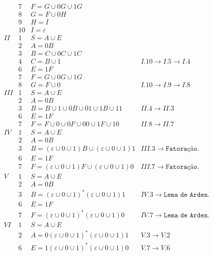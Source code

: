 \documentclass[12pt]{article}
\begin{document}
\begin{itemize}
{$$\begin{array}{ccll}
      & 7 & F = G \cup 0G \cup 1G&\\
      & 8 & G = F \cup 0H&\\
      & 9 & H = I&\\
      & 10& I = \varepsilon&\\
  \hline
   II & 1 & S = A \cup E &\\
      & 2 & A = 0B &\\
      & 3 & B = C \cup 0C \cup 1C&\\
      & 4 & C = B \cup 1 & I.10\rightarrow I.5\rightarrow I.4\\
      & 6 & E = 1F&\\
      & 7 & F = G \cup 0G \cup 1G&\\
      & 8 & G = F \cup 0 & I.10\rightarrow I.9\rightarrow I.8\\
  \hline
  III & 1 & S = A \cup E &\\
      & 2 & A = 0B &\\
      & 3 & B = B \cup 1 \cup 0B \cup 01 \cup 1B \cup 11 & II.4\rightarrow II.3\\
      & 6 & E = 1F&\\
      & 7 & F = F \cup 0 \cup 0F \cup 00 \cup 1F \cup 10& II.8\rightarrow II.7\\
  \hline
   IV & 1 & S = A \cup E &\\
      & 2 & A = 0B &\\
      & 3 & B = (\varepsilon \cup 0 \cup 1)B \cup (\varepsilon \cup 0 \cup 1)1 & III.3 \rightarrow\texttt{Fatoração.}\\
      & 6 & E = 1F&\\
      & 7 & F = (\varepsilon \cup 0 \cup 1)F \cup (\varepsilon \cup 0 \cup 1)0 & III.7 \rightarrow\texttt{Fatoração.}\\
  \hline
    V & 1 & S = A \cup E &\\
      & 2 & A = 0B &\\
      & 3 & B = (\varepsilon \cup 0 \cup 1)^*(\varepsilon \cup 0 \cup 1)1 & IV.3 \rightarrow\texttt{Lema de Arden.}\\
      & 6 & E = 1F&\\
      & 7 & F = (\varepsilon \cup 0 \cup 1)^*(\varepsilon \cup 0 \cup 1)0 & IV.7 \rightarrow\texttt{Lema de Arden.}\\
  \hline
   VI & 1 & S = A \cup E &\\
      & 2 & A = 0(\varepsilon \cup 0 \cup 1)^*(\varepsilon \cup 0 \cup 1)1 & V.3 \rightarrow V.2\\
      & 6 & E = 1(\varepsilon \cup 0 \cup 1)^*(\varepsilon \cup 0 \cup 1)0& V.7 \rightarrow V.6\\

\end{array}$$}
\end{itemize}
\end{document}
